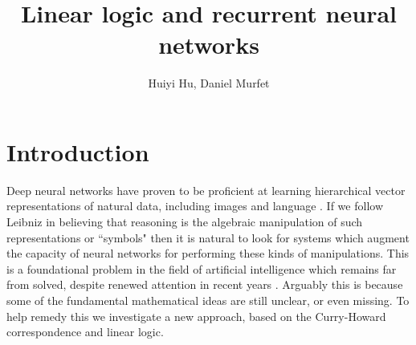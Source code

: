 \documentclass[english,letter paper,12pt,leqno]{article}
\theoremstyle{example}
\numberwithin{equation}{section}
\def\res{\operatorname{Res}}
\begin{document}
\def\Res{\res\!}
\newcommand{\ud}{\mathrm{d}}
\newcommand{\Ress}[1]{\res_{#1}\!}
\newcommand{\cat}[1]{\mathcal{#1}}
\newcommand{\lto}{\longrightarrow}
\newcommand{\xlto}[1]{\stackrel{#1}\lto}
\newcommand{\mf}[1]{\mathfrak{#1}}
\newcommand{\md}[1]{\mathscr{#1}}
\def\sus{\l}
\def\l{\,|\,}
\def\sgn{\textup{sgn}}
\newcommand{\den}[1]{\llbracket #1 \rrbracket}
\def\inta{\textbf{int}}
\def\binta{\textbf{bint}}
\def\boola{\textbf{bool}}
\def\comp{\underline{\textup{comp}}}
\def\mult{\underline{\textup{mult}}}
\def\repeat{\underline{\textup{repeat}}}
\def\master{\underline{\textup{master}}}
\def\feed{\underline{\textup{feed}}}
\def\relu{\sigma}
\def\softmax{\sigma_{soft}}
\def\sigmoid{\sigma_{sigm}}

\DeclarePairedDelimiter\bra{\langle}{\rvert}
\DeclarePairedDelimiter\ket{\lvert}{\rangle}

\title{Linear logic and recurrent neural networks}
\author{Huiyi Hu, Daniel Murfet}

\maketitle

\tableofcontents

\section{Introduction}

Deep neural networks have proven to be proficient at learning hierarchical vector representations of natural data, including images and language \cite{dlnature}. If we follow Leibniz \cite{frege} in believing that reasoning is the algebraic manipulation of such representations or ``symbols" then it is natural to look for systems which augment the capacity of neural networks for performing these kinds of manipulations. This is a foundational problem in the field of artificial intelligence which remains far from solved, despite renewed attention in recent years \cite{ntm, joulin, dnc, graves_etal, grefen, weston, tarlow, freitas, neuralprog}. Arguably this is because some of the fundamental mathematical ideas are still unclear, or even missing. To help remedy this we investigate a new approach, based on the Curry-Howard correspondence and linear logic.
\end{document}
